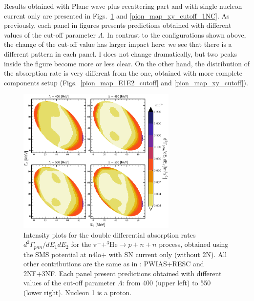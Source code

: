     Results obtained with Plane wave plus recattering part and with single nucleon current only
    are presented in Figs.~\ref{pion_map_E1E2_cutoff_1NC} and \ref{pion_map_xy_cutoff_1NC}.
    As previously, each panel in figures presents predictions obtained with different values of the cut-off parameter $\Lambda$.
    In contrast to the configurations shown above, the change of the cut-off value has larger impact here:
    we see that there is a different pattern in each panel. I does not change dramatically, but 
    two peaks inside the figure become more or less clear. On the other hand, the distribution of 
    the absorption rate is very different from the one, obtained with more complete components setup 
    (Figs.~\ref{pion_map_E1E2_cutoff} and \ref{pion_map_xy_cutoff}).

    \begin{figure}[h]
        \begin{center}
        \includegraphics[width=0.7\textwidth]{PlotData/PION/Dalitz_maps/figures/Dalitz_map_pnn_E1E2_cutofs_1NC.pdf}
        \end{center}
        \caption{Intensity plots for the double differential absorption rates
        $d^2 \Gamma_{pnn}/dE_1dE_2$ for the $\pi^- + ^3\text{He} \rightarrow p + n + n$
        process, obtained using the SMS potential at \gls{n4lo+}
        with SN current only (without 2N).
        All other contributions are the same as in : PWIAS+RESC and 2NF+3NF.
        Each panel present predictions obtained with different values of the cut-off parameter $\Lambda$:
        from \SI{400}{\mev} (upper left) to \SI{550}{\mev} (lower right). Nucleon 1 is a proton.}
        \label{pion_map_E1E2_cutoff_1NC}
    \end{figure}

